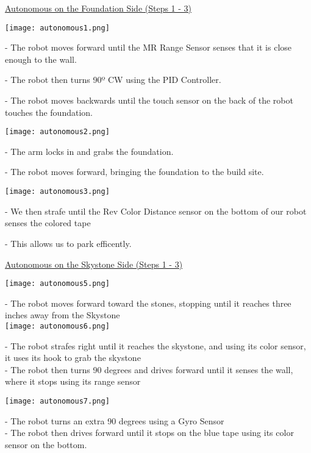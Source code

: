 \documentclass{article}[12pt]
\begin{document}
\begin{center}

\underline{Autonomous on the Foundation Side  (Steps 1 - 3)}

{\texttt{[image: autonomous1.png]}}

- The robot moves forward until the MR Range Sensor senses that it is close enough to the wall. \newline

- The robot then turns 90º CW using the PID Controller. \newline

- The robot moves backwards until the touch sensor on the back of the robot touches the foundation. 

{\texttt{[image: autonomous2.png]}}

\indent \indent- The arm locks in and grabs the foundation. \newline

\indent \indent - The robot moves forward, bringing the foundation to the build site. \newline

{\texttt{[image: autonomous3.png]}}

- We then strafe until the Rev Color Distance sensor on the bottom of our robot senses the colored tape \newline

- This allows us to park efficently. \newline


\underline{Autonomous on the Skystone Side  (Steps 1 - 3)}

{\texttt{[image: autonomous5.png]}}

- The robot moves forward toward the stones, stopping until it reaches three inches away from the Skystone\\

{\texttt{[image: autonomous6.png]}}

\indent \indent- The robot strafes right until it reaches the skystone, and using its color sensor, it uses its hook to grab the skystone \newline \\

\indent \indent - The robot then turns 90 degrees and drives forward until it senses the wall, where it stops using its range sensor \newline

{\texttt{[image: autonomous7.png]}}

- The robot turns an extra 90 degrees using a Gyro Sensor \\

- The robot then drives forward until it stops on the blue tape using its color sensor on the bottom. 
 \newline

\end{center}
\end{document}
